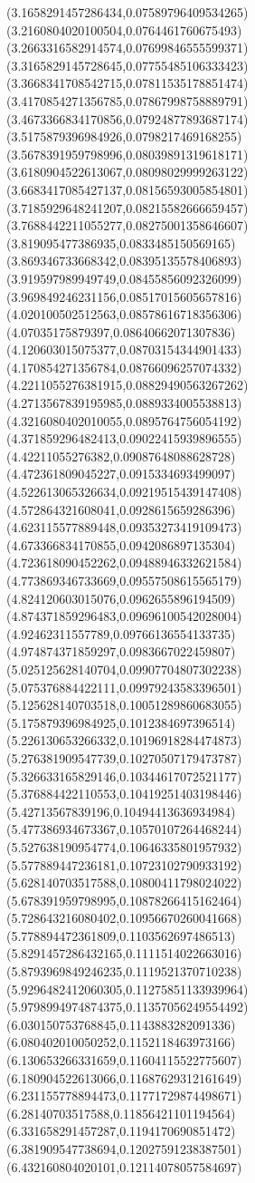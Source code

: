 {(3.1658291457286434,0.07589796409534265)
(3.2160804020100504,0.0764461760675493)
(3.2663316582914574,0.07699846555599371)
(3.3165829145728645,0.07755485106333423)
(3.3668341708542715,0.07811535178851474)
(3.4170854271356785,0.07867998758889791)
(3.4673366834170856,0.07924877893687174)
(3.5175879396984926,0.0798217469168255)
(3.5678391959798996,0.08039891319618171)
(3.6180904522613067,0.08098029999263122)
(3.6683417085427137,0.08156593005854801)
(3.7185929648241207,0.08215582666659457)
(3.7688442211055277,0.08275001358646607)
(3.819095477386935,0.0833485150569165)
(3.869346733668342,0.08395135578406893)
(3.919597989949749,0.08455856092326099)
(3.969849246231156,0.08517015605657816)
(4.020100502512563,0.08578616718356306)
(4.07035175879397,0.08640662071307836)
(4.120603015075377,0.08703154344901433)
(4.170854271356784,0.08766096257074332)
(4.2211055276381915,0.08829490563267262)
(4.2713567839195985,0.0889334005538813)
(4.3216080402010055,0.0895764756054192)
(4.371859296482413,0.09022415939896555)
(4.42211055276382,0.09087648088628728)
(4.472361809045227,0.0915334693499097)
(4.522613065326634,0.09219515439147408)
(4.572864321608041,0.0928615659286396)
(4.623115577889448,0.09353273419109473)
(4.673366834170855,0.0942086897135304)
(4.723618090452262,0.09488946332621584)
(4.773869346733669,0.09557508615565179)
(4.824120603015076,0.0962655896194509)
(4.874371859296483,0.09696100542028004)
(4.92462311557789,0.09766136554133735)
(4.974874371859297,0.0983667022459807)
(5.025125628140704,0.09907704807302238)
(5.075376884422111,0.09979243583396501)
(5.125628140703518,0.10051289860683055)
(5.175879396984925,0.1012384697396514)
(5.226130653266332,0.10196918284474873)
(5.276381909547739,0.10270507179473787)
(5.326633165829146,0.10344617072521177)
(5.376884422110553,0.10419251403198446)
(5.42713567839196,0.10494413636934984)
(5.477386934673367,0.10570107264468244)
(5.527638190954774,0.10646335801957932)
(5.577889447236181,0.10723102790933192)
(5.628140703517588,0.10800411798024022)
(5.678391959798995,0.10878266415162464)
(5.728643216080402,0.10956670260041668)
(5.778894472361809,0.1103562697486513)
(5.8291457286432165,0.1111514022663016)
(5.8793969849246235,0.1119521370710238)
(5.9296482412060305,0.11275851133939964)
(5.9798994974874375,0.11357056249554492)
(6.030150753768845,0.1143883282091336)
(6.080402010050252,0.1152118463973166)
(6.130653266331659,0.11604115522775607)
(6.180904522613066,0.11687629312161649)
(6.231155778894473,0.11771729874498671)
(6.28140703517588,0.11856421101194564)
(6.331658291457287,0.1194170690851472)
(6.381909547738694,0.12027591238387501)
(6.432160804020101,0.12114078057584697)
}
